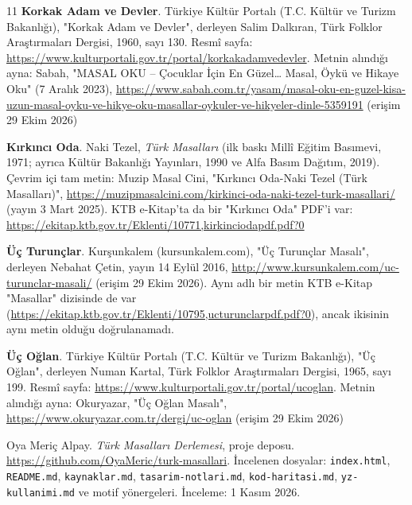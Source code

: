 \documentclass[12pt,a4paper]{article}
\begin{document}
\begin{thebibliography}{11}
 \textbf{Korkak Adam ve Devler}. Türkiye Kültür Portalı (T.C. Kültür ve Turizm Bakanlığı), "Korkak Adam ve Devler", derleyen Salim Dalkıran, Türk Folklor Araştırmaları Dergisi, 1960, sayı 130. Resmî sayfa: \url{https://www.kulturportali.gov.tr/portal/korkakadamvedevler}. Metnin alındığı ayna: Sabah, "MASAL OKU – Çocuklar İçin En Güzel… Masal, Öykü ve Hikaye Oku" (7 Aralık 2023), \url{https://www.sabah.com.tr/yasam/masal-oku-en-guzel-kisa-uzun-masal-oyku-ve-hikye-oku-masallar-oykuler-ve-hikyeler-dinle-5359191} (erişim 29 Ekim 2026)

 \textbf{Kırkıncı Oda}. Naki Tezel, \emph{Türk Masalları} (ilk baskı Millî Eğitim Basımevi, 1971; ayrıca Kültür Bakanlığı Yayınları, 1990 ve Alfa Basım Dağıtım, 2019). Çevrim içi tam metin: Muzip Masal Cini, "Kırkıncı Oda-Naki Tezel (Türk Masalları)", \url{https://muzipmasalcini.com/kirkinci-oda-naki-tezel-turk-masallari/} (yayın 3 Mart 2025). KTB e-Kitap'ta da bir "Kırkıncı Oda" PDF'i var: \url{https://ekitap.ktb.gov.tr/Eklenti/10771,kirkinciodapdf.pdf?0}

 \textbf{Üç Turunçlar}. Kurşunkalem (kursunkalem.com), "Üç Turunçlar Masalı", derleyen Nebahat Çetin, yayın 14 Eylül 2016, \url{http://www.kursunkalem.com/uc-turunclar-masali/} (erişim 29 Ekim 2026). Aynı adlı bir metin KTB e-Kitap "Masallar" dizisinde de var (\url{https://ekitap.ktb.gov.tr/Eklenti/10795,ucturunclarpdf.pdf?0}), ancak ikisinin aynı metin olduğu doğrulanamadı.

 \textbf{Üç Oğlan}. Türkiye Kültür Portalı (T.C. Kültür ve Turizm Bakanlığı), "Üç Oğlan", derleyen Numan Kartal, Türk Folklor Araştırmaları Dergisi, 1965, sayı 199. Resmî sayfa: \url{https://www.kulturportali.gov.tr/portal/ucoglan}. Metnin alındığı ayna: Okuryazar, "Üç Oğlan Masalı", \url{https://www.okuryazar.com.tr/dergi/uc-oglan} (erişim 29 Ekim 2026)

 Oya Meriç Alpay. \emph{Türk Masalları Derlemesi}, proje deposu. \url{https://github.com/OyaMeric/turk-masallari}. İncelenen dosyalar: \texttt{index.html}, \texttt{README.md}, \texttt{kaynaklar.md}, \texttt{tasarim-notlari.md}, \texttt{kod-haritasi.md}, \texttt{yz-kullanimi.md} ve motif yönergeleri. İnceleme: 1 Kasım 2026.
\end{thebibliography}
\appendix
\clearpage
\end{document}
